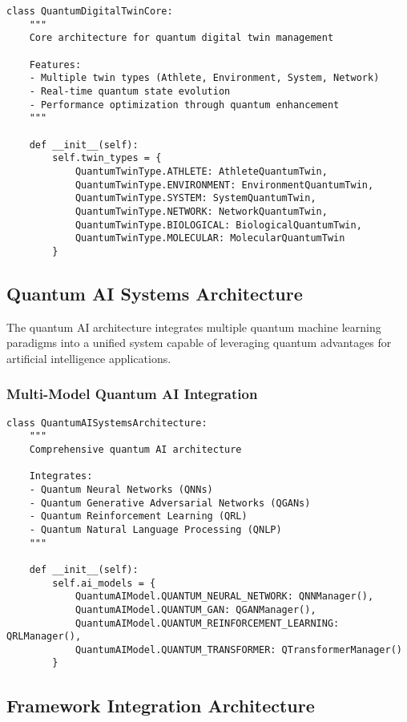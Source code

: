 \documentclass[12pt,a4paper]{report}
\begin{document}
\begin{lstlisting}
class QuantumDigitalTwinCore:
    """
    Core architecture for quantum digital twin management

    Features:
    - Multiple twin types (Athlete, Environment, System, Network)
    - Real-time quantum state evolution
    - Performance optimization through quantum enhancement
    """

    def __init__(self):
        self.twin_types = {
            QuantumTwinType.ATHLETE: AthleteQuantumTwin,
            QuantumTwinType.ENVIRONMENT: EnvironmentQuantumTwin,
            QuantumTwinType.SYSTEM: SystemQuantumTwin,
            QuantumTwinType.NETWORK: NetworkQuantumTwin,
            QuantumTwinType.BIOLOGICAL: BiologicalQuantumTwin,
            QuantumTwinType.MOLECULAR: MolecularQuantumTwin
        }
\end{lstlisting}

\subsection{Quantum AI Systems Architecture}

The quantum AI architecture integrates multiple quantum machine learning paradigms into a unified system capable of leveraging quantum advantages for artificial intelligence applications.

\subsubsection{Multi-Model Quantum AI Integration}

\begin{lstlisting}
class QuantumAISystemsArchitecture:
    """
    Comprehensive quantum AI architecture

    Integrates:
    - Quantum Neural Networks (QNNs)
    - Quantum Generative Adversarial Networks (QGANs)
    - Quantum Reinforcement Learning (QRL)
    - Quantum Natural Language Processing (QNLP)
    """

    def __init__(self):
        self.ai_models = {
            QuantumAIModel.QUANTUM_NEURAL_NETWORK: QNNManager(),
            QuantumAIModel.QUANTUM_GAN: QGANManager(),
            QuantumAIModel.QUANTUM_REINFORCEMENT_LEARNING: QRLManager(),
            QuantumAIModel.QUANTUM_TRANSFORMER: QTransformerManager()
        }
\end{lstlisting}

\subsection{Framework Integration Architecture}
\end{document}
